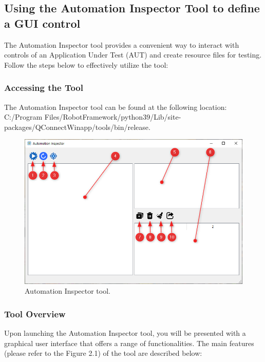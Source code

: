 \hypertarget{definition}{%
\subsection{\texorpdfstring{\textbf{Using the Automation Inspector Tool to define a GUI control}}{definition}}\label{definition}}
The Automation Inspector tool provides a convenient way to interact with controls of an Application Under Test (AUT) and create resource files for testing. Follow the steps below to effectively utilize the tool:

\subsubsection{Accessing the Tool}
The Automation Inspector tool can be found at the following location: C:/Program Files/RobotFramework/python39/Lib/site-packages/QConnectWinapp/tools/bin/release.
\begin{figure}[h]
  \centering
  \includegraphics[width=\linewidth]{pictures/inspector_overview.png}
  \caption{Automation Inspector tool.}
\end{figure}
\subsubsection{Tool Overview}
Upon launching the Automation Inspector tool, you will be presented with a graphical user interface that offers a range of functionalities. The main features (please refer to the Figure 2.1) of the tool are described below:

